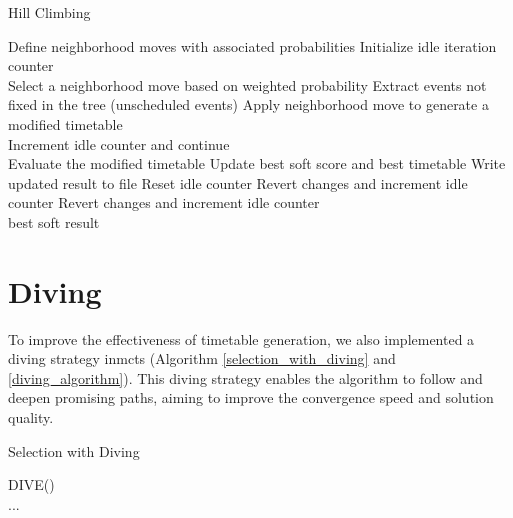 \begin{algorithm}
\caption{Hill Climbing}\label{run_hill_climbing}
\begin{algorithmic}[1]
    \State Define neighborhood moves with associated probabilities
    \State Initialize idle iteration counter
\\
        \State Select a neighborhood move based on weighted probability
        \State Extract events not fixed in the tree (unscheduled events)
        \State Apply neighborhood move to generate a modified timetable
\\
            \State Increment idle counter and continue
        \EndIf
\\
	\State Evaluate the modified timetable
                \State Update best soft score and best timetable
                \State Write updated result to file
                    \State {}
                \EndIf
                \State Reset idle counter
            \Else
                \State Revert changes and increment idle counter
            \EndIf
        \Else
            \State Revert changes and increment idle counter
        \EndIf
    \EndWhile
\\
    \State \Return best soft result
\EndFunction
\end{algorithmic}
\end{algorithm}

\section{Diving}\label{sec:diving}

To improve the effectiveness of timetable generation, we also implemented a diving strategy in\ac{mcts} (Algorithm \ref{selection_with_diving} and \ref{diving_algorithm}). This diving strategy enables the algorithm to follow and deepen promising paths, aiming to improve the convergence speed and solution quality.

\begin{algorithm}
\caption{Selection with Diving}\label{selection_with_diving}
\begin{algorithmic}[1]
		\State DIVE()
	\EndIf
\\
	\State ... 	
	\\
\EndProcedure
\end{algorithmic}
\end{algorithm}

